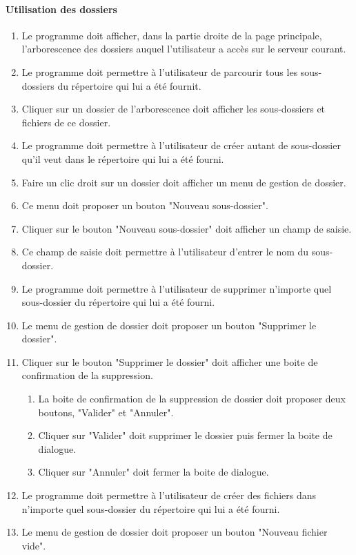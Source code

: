 \documentclass[10pt,a4paper]{report}
\begin{document}
\paragraph{Utilisation des dossiers}
	\begin{enumerate}
		\item Le programme doit afficher, dans la partie droite de la page principale, l'arborescence des dossiers auquel l'utilisateur a accès sur le serveur courant.
		\item Le programme doit permettre à l'utilisateur de parcourir tous les sous-dossiers du répertoire qui lui a été fournit.
		\item Cliquer sur un dossier de l'arborescence doit afficher les sous-dossiers et fichiers de ce dossier.
		\item Le programme doit permettre à l'utilisateur de créer autant de sous-dossier qu'il veut dans le répertoire qui lui a été fourni.
		\item Faire un clic droit sur un dossier doit afficher un menu de gestion de dossier.
		\item Ce menu doit proposer un bouton "Nouveau sous-dossier".
		\item Cliquer sur le bouton "Nouveau sous-dossier" doit afficher un champ de saisie.
		\item Ce champ de saisie doit permettre à l'utilisateur d'entrer le nom du sous-dossier.
		\item Le programme doit permettre à l'utilisateur de supprimer n'importe quel sous-dossier du répertoire qui lui a été fourni.
		\item Le menu de gestion de dossier doit proposer un bouton "Supprimer le dossier".
		\item Cliquer sur le bouton "Supprimer le dossier" doit afficher une boite de confirmation de la suppression.
		\begin{enumerate}[label=\arabic*.]
			\item La boite de confirmation de la suppression de dossier doit proposer deux boutons, "Valider" et "Annuler".
			\item Cliquer sur "Valider" doit supprimer le dossier puis fermer la boite de dialogue.
			\item Cliquer sur "Annuler" doit fermer la boite de dialogue.
		\end{enumerate}
		\item Le programme doit permettre à l'utilisateur de créer des fichiers dans n'importe quel sous-dossier du répertoire qui lui a été fourni.
		\item Le menu de gestion de dossier doit proposer un bouton "Nouveau fichier vide".

\end{enumerate}
\end{document}
